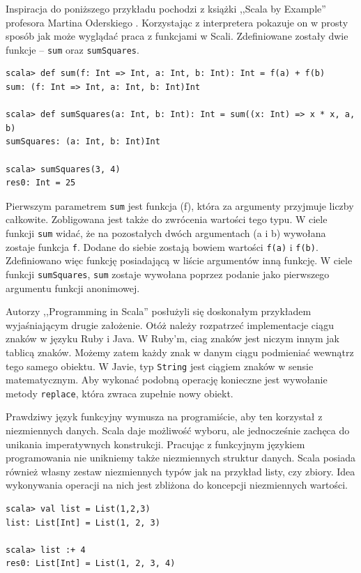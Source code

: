 \documentclass[brudnopis]{xmgr}
\begin{document}
Inspiracja do poniższego przykładu pochodzi z książki ,,Scala by Example'' profesora Martina Oderskiego \cite[s. 22]{Odersky:2014:SBE}. Korzystając z interpretera pokazuje on w prosty sposób jak może wyglądać praca z funkcjami w Scali. Zdefiniowane zostały dwie funkcje -- \texttt{sum} oraz \texttt{sumSquares}.

\begin{verbatim}
scala> def sum(f: Int => Int, a: Int, b: Int): Int = f(a) + f(b)
sum: (f: Int => Int, a: Int, b: Int)Int

scala> def sumSquares(a: Int, b: Int): Int = sum((x: Int) => x * x, a, b)
sumSquares: (a: Int, b: Int)Int

scala> sumSquares(3, 4)
res0: Int = 25
\end{verbatim}

Pierwszym parametrem \texttt{sum} jest funkcja (f), która za argumenty przyjmuje liczby całkowite. Zobligowana jest także do zwrócenia wartości tego typu. W ciele funkcji \texttt{sum} widać, że na pozostałych dwóch argumentach (a i b) wywołana zostaje funkcja \texttt{f}. Dodane do siebie zostają bowiem wartości \texttt{f(a)} i \texttt{f(b)}. Zdefiniowano więc funkcję posiadającą w liście argumentów inną funkcję. W ciele funkcji \texttt{sumSquares}, \texttt{sum} zostaje wywołana poprzez podanie jako pierwszego argumentu funkcji anonimowej.

Autorzy ,,Programming in Scala'' posłużyli się doskonałym przykładem wyjaśniającym drugie założenie. \cite[s.57]{Odersky:2010:PIS} Otóż należy rozpatrzeć implementacje ciągu znaków w języku Ruby i Java. W Ruby'm, ciag znaków jest niczym innym jak tablicą znaków. Możemy zatem każdy znak w danym ciągu podmieniać wewnątrz tego samego obiektu. W Javie, typ \texttt{String} jest ciągiem znaków w sensie matematycznym. Aby wykonać podobną operację konieczne jest wywołanie metody \texttt{replace}, która zwraca zupełnie nowy obiekt.

Prawdziwy język funkcyjny wymusza na programiście, aby ten korzystał z niezmiennych danych. Scala daje możliwość wyboru, ale jednocześnie zachęca do unikania imperatywnych konstrukcji. Pracując z funkcyjnym językiem programowania nie unikniemy także niezmiennych struktur danych. Scala posiada również własny zestaw niezmiennych typów jak na przykład listy, czy zbiory. Idea wykonywania operacji na nich jest zbliżona do koncepcji niezmiennych wartości.

\begin{verbatim}
scala> val list = List(1,2,3)
list: List[Int] = List(1, 2, 3)

scala> list :+ 4
res0: List[Int] = List(1, 2, 3, 4)
\end{verbatim}
\end{document}
